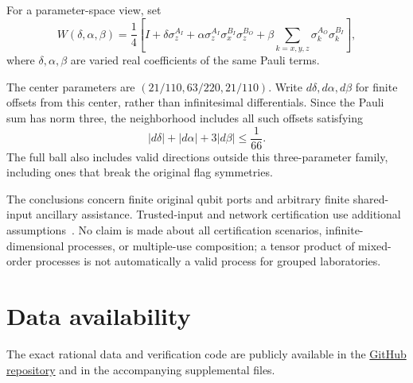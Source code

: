 \documentclass[11pt]{article}
\begin{document}
For a parameter-space view, set
\begin{equation}
 W(\delta,\alpha,\beta)=\frac14\left[I+\delta\sigma_z^{A_I}
 +\alpha\sigma_z^{A_I}\sigma_x^{B_I}\sigma_z^{B_O}
 +\beta\sum_{k=x,y,z}\sigma_k^{A_O}\sigma_k^{B_I}\right],
 \label{eq:parameter-family}
\end{equation}
where $\delta,\alpha,\beta$ are varied real coefficients of the same Pauli terms.

The center parameters are $(21/110,63/220,21/110)$. Write $d\delta,d\alpha,d\beta$ for finite offsets from this center, rather than infinitesimal differentials. Since the Pauli sum has norm three, the neighborhood includes all such offsets satisfying
\begin{equation}
 |d\delta|+|d\alpha|+3|d\beta|\le\frac1{66}.
 \label{eq:parameter-neighborhood}
\end{equation}
The full ball also includes valid directions outside this three-parameter family, including ones that break the original flag symmetries.

The conclusions concern finite original qubit ports and arbitrary finite shared-input ancillary assistance. Trusted-input and network certification use additional assumptions~\cite{Trusted,Network}. No claim is made about all certification scenarios, infinite-dimensional processes, or multiple-use composition; a tensor product of mixed-order processes is not automatically a valid process for grouped laboratories.

\section{Data availability}
The exact rational data and verification code are publicly available in the \href{https://github.com/phycxli/Extensible-Causality-Does-Not-Guarantee-Pure-Quantum-Dilations}{GitHub repository} and in the accompanying supplemental files.
\end{document}
